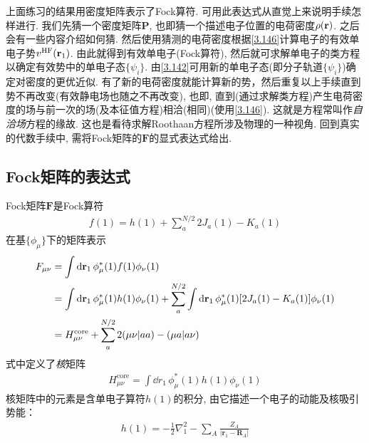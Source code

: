 上面练习的结果用密度矩阵表示了Fock算符. 
可用此表达式从直觉上来说明\hft 手续怎样进行. 
我们先猜一个密度矩阵$\mathbf{P}$, 
也即猜一个描述电子位置的电荷密度$\rho(\mathbf{r})$. 
之后会有一些内容介绍如何猜. 
然后使用猜测的电荷密度根据\eqref{3.146}计算电子的有效单电子势$v^\mathrm{HF}(\mathbf{r}_1)$. 
由此就得到有效单电子\ha (Fock算符), 
然后就可求解单电子的类\sch 方程以确定有效势中的单电子态$\{\psi_i\}$. 
由\eqref{3.142}可用新的单电子态(即分子轨道$\{\psi_i\}$)确定对密度的更优近似. 
有了新的电荷密度就能计算新的\hft 势，然后重复以上手续直到\hft 势不再改变(有效静电场也随之不再改变), 
也即, 
直到(通过求解类\sch 方程)产生电荷密度的场与前一次的场(及\hft 本征值方程)相洽(相同)(使用\eqref{3.146}). 
这就是\hft 方程常叫作\emph{自洽场}方程的缘故. 
这也是看待求解Roothaan方程所涉及物理的一种视角. 
回到真实的代数手续中, 
需将Fock矩阵的$\mathbf{F}$的显式表达式给出.

\subsection{Fock矩阵的表达式}
Fock矩阵$\mathbf{F}$是Fock算符
\begin{align}
	f(1) = h(1) + \sum_{a}^{N/2}2J_a(1) -K_a(1)
\end{align}
在基$\{\phi_\mu\}$下的矩阵表示
\begin{align}
	\label{3.148}
	F_{\mu\nu} & = \int\dd{r}_1\,\phi_\mu^*(1)f(1)\phi_\nu(1)\notag\\
	& = \int\dd{r}_1\,\phi_\mu^*(1)h(1)\phi_\nu(1) + \sum_{a}^{N/2}\int\dd{r}_1\,\phi_\mu^*(1)[2J_a(1)-K_a(1)]\phi_\nu(1)\notag\\
	& = H_{\mu\nu}^\mathrm{core} + \sum_{a}^{N/2}2(\mu\nu|aa)-(\mu a|a\nu)
\end{align}
式中定义了\emph{核\ha}矩阵
\begin{align}
	H_{\mu\nu}^\mathrm{core} = \int\dd{r}_1\,\phi_\mu^*(1)h(1)\phi_\nu(1)
\end{align}
核\ha 矩阵中的元素是含单电子算符$h(1)$的积分, 
由它描述一个电子的动能及核吸引势能：
\begin{align}
	h(1) = -\frac{1}{2}\nabla_1^2 - \sum_A\frac{Z_A}{|\mathbf{r}_1-\mathbf{R}_A|}
\end{align}

